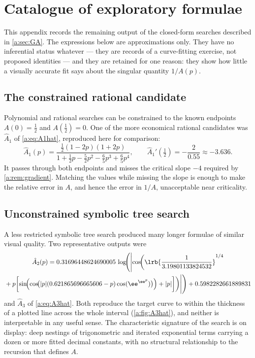 \section{Catalogue of exploratory formulae}
\label{a:app:catalogue}

This appendix records the remaining output of the closed-form searches described in
\cref{a:sec:GA}. The expressions below are approximations only. They have no
inferential status whatever --- they are records of a curve-fitting exercise, not
proposed identities --- and they are retained for one reason: they show how little a
visually accurate fit says about the singular quantity $1/A(p)$.

\subsection*{The constrained rational candidate}

Polynomial and rational searches can be constrained to the known endpoints
$A(0)=\tfrac12$ and $A(\tfrac12)=0$. One of the more economical rational candidates
was $\hat A_1$ of \cref{a:eq:A1hat}, reproduced here for comparison:
\begin{equation*}
\hat A_1(p) = \frac{\tfrac12(1-2p)(1+2p)}
{1+\tfrac12p-\tfrac52p^2-\tfrac65p^3+\tfrac65p^4},
\qquad
\hat A_1'(\tfrac12) = -\frac{2}{0.55}\approx-3.636 .
\end{equation*}
It passes through both endpoints and misses the critical slope $-4$ required by
\cref{a:rem:gradient}. Matching the values while missing the slope is enough to
make the relative error in $A$, and hence the error in $1/A$, unacceptable near
criticality.

\subsection*{Unconstrained symbolic tree search}

A less restricted symbolic tree search produced many longer formulae of similar
visual quality. Two representative outputs were
\begin{multline}
\label{a:eq:A2hat}
\hat A_2(p)
= 0.31696448624690005\,
\log\!\Biggl(
\Biggl|\cos\!\biggl(
\lrb{\frac{1}{3.19801133824532}}^{1/4}\\
{}+p\biggl[
\sin\!\Bigl(
\cos\!\bigl(|p|(0.621865696665606-p)\cos(\ee^{\ee^{p}})\bigr)
\Bigr)+|p|
\biggr]\biggr)\Biggr|
\Biggr)
+ 0.5982282661889831
\end{multline}
and $\hat A_3$ of \cref{a:eq:A3hat}. Both reproduce the target curve to within the
thickness of a plotted line across the whole interval (\cref{a:fig:A3hat}), and
neither is interpretable in any useful sense. The characteristic signature of the
search is on display: deep nestings of trigonometric and iterated exponential terms
carrying a dozen or more fitted decimal constants, with no structural relationship
to the recursion that defines $A$.

